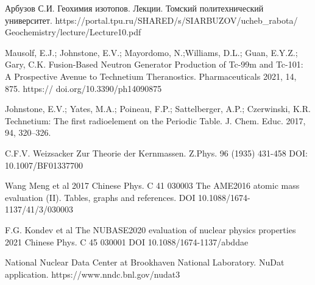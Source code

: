 \documentclass[a5paper,openany]{book}
\begin{document}
\begin{thebibliography}{99}




Арбузов С.И. Геохимия изотопов. Лекции. Томский политехнический университет.
https://portal.tpu.ru/SHARED/s/SIARBUZOV/ucheb\_rabota/\\
Geochemistry/lecture/Lecture10.pdf

Mausolf, E.J.; Johnstone, E.V.; Mayordomo, N.;Williams, D.L.; Guan, E.Y.Z.; Gary, C.K. Fusion-Based
Neutron Generator Production of Tc-99m and Tc-101: A Prospective Avenue to Technetium Theranostics.
Pharmaceuticals 2021, 14, 875. 
https://
doi.org/10.3390/ph14090875


Johnstone, E.V.; Yates, M.A.; Poineau, F.P.; Sattelberger, A.P.; Czerwinski, K.R. Technetium: The first radioelement on the Periodic
Table. J. Chem. Educ. 2017, 94, 320–326.

C.F.V. Weizsacker
Zur Theorie der Kernmassen. Z.Phys. 96 (1935) 431-458 DOI: 10.1007/BF01337700

Wang Meng et al 2017 Chinese Phys. C 41 030003 The AME2016 atomic mass evaluation (II). Tables, graphs and references. DOI 10.1088/1674-1137/41/3/030003 

F.G. Kondev et al The NUBASE2020 evaluation of nuclear physics properties 
2021 Chinese Phys. C 45 030001
DOI 10.1088/1674-1137/abddae

 National Nuclear Data Center at Brookhaven National Laboratory. NuDat application. 
https://www.nndc.bnl.gov/nudat3	


\end{thebibliography}
\end{document}
